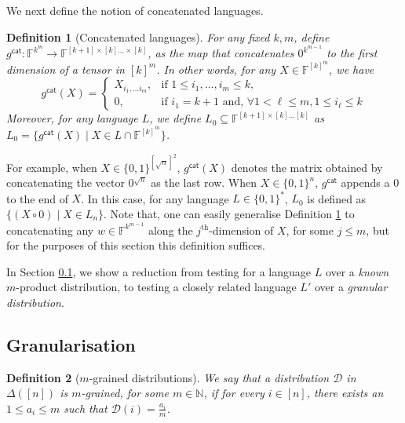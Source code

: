 \documentclass[10pt,a4paper]{article}
\newtheorem{definition}{Definition}[section]
\newcommand{\F}{\mathbb{F}}
\newcommand{\N}{\mathbb{N}}
\begin{document}
\noindent We next define the notion of concatenated languages.
\begin{definition}[Concatenated languages]
    \label{def:concat_lang}
     For any fixed $k, m$, define $g^{\mathsf{cat}} : \F^{k^m} \rightarrow \F^{[k+1] \times [k] \dots \times [k]}$, as the map that concatenates $0^{k^{m-1}}$ to the first dimension of a tensor in $[k]^m$. In other words, for any $X \in \F^{[k]^m}$, we have
        \begin{equation*}
        g^{\mathsf{cat}} (X) = 
        \begin{cases}
        X_{i_1, \dots i_m}, & \text{if } 1 \leq i_1, \dots, i_m \leq k, \\
        0, & \text{if } i_1 = k+1 \text{ and, } \forall 1 < \ell \leq m, 1 \leq i_\ell \leq k
        \end{cases}
    \end{equation*}
    Moreover, for any language $L$, we define $L_0 \subseteq \F^{[k+1] \times [k] \dots [k]}$ as $L_0 = \{ g^{\mathsf{cat}}(X) \mid X \in L \cap \F^{[k]^m} \}$.
\end{definition}

\vspace{0.05in}
For example, when $X \in \{0,1\}^{[\sqrt{n}]^2}$, $g^{\mathsf{cat}}(X)$ denotes the matrix obtained by concatenating the vector $0^{\sqrt{n}}$ as the last row. When $X \in \{0,1\}^n$, $g^{\mathsf{cat}}$ appends a $0$ to the end of $X$. In this case, for any language $L \in \{0,1\}^*$, $L_0$ is defined as $\{(X \circ 0) \mid X \in L_n \}$. Note that, one can easily generalise Definition \ref{def:concat_lang} to concatenating any $w \in \F^{k^{m-1}}$ along the $j^{\text{th}}$-dimension of $X$, for some $j \leq m$, but for the purposes of this section this definition suffices.

In Section \ref{sec:gran}, we show a reduction from testing for a language $L$ over a \textit{known} $m$-product distribution, to testing a closely related language $L'$ over a \textit{granular distribution}.

\subsection{Granularisation}
\label{sec:gran}

\begin{definition}[$m$-grained distributions]
    We say that a distribution $\mathcal{D}$ in $\Delta([n])$ is $m$-grained, for some $m \in \N$, if for every $i\in [n]$, there exists an $1 \leq a_{i} \leq m$ such that $\mathcal{D}(i)=\frac{a_{i}}{m}$. 
\end{definition}
\end{document}
